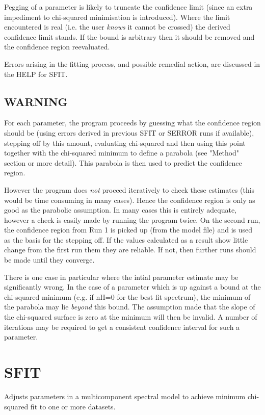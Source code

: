 \documentclass{book}
\renewcommand{\_}{{\tt\char'137}}     %
\begin{document}
Pegging of a parameter is likely to truncate the confidence limit
(since an extra impediment to chi-squared minimisation is
introduced). Where the limit encountered is real (i.e. the user
{\em knows} it cannot be crossed) the derived confidence limit stands.
If the bound is arbitrary then it should be removed and the
confidence region reevaluated.

Errors arising in the fitting process, and possible remedial
action, are discussed in the HELP for SFIT.

\subsection{WARNING}
For each parameter, the program proceeds by guessing what the
confidence region should be (using errors derived in previous
SFIT or SERROR runs if available), stepping off by this amount,
evaluating chi-squared and then using this point together with
the chi-squared minimum to define a parabola (see "Method" section
or more detail). This parabola is then used to predict the
confidence region.

However the program does {\em not} proceed iteratively to check these
estimates (this would be time consuming in many cases). Hence
the confidence region is only as good as the parabolic assumption.
In many cases this is entirely adequate, however a check is easily
made by running the program twice. On the second run, the confidence
region from Run 1 is picked up (from the model file) and is used
as the basis for the stepping off. If the values calculated as a
result show little change from the first run them they are reliable.
If not, then further runs should be made until they converge.

There is one case in particular where the intial parameter estimate
may be significantly wrong. In the case of a parameter which is up
against a bound at the chi-squared minimum (e.g. if nH=0 for the
best fit spectrum), the minimum of the parabola may lie
{\em beyond} this bound. The assumption made that the slope of the
chi-squared surface is zero at the minimum will then be invalid. A
number of iterations may be required to get a consistent confidence
interval for such a parameter.

\section{SFIT}
Adjusts parameters in a multicomponent spectral model to achieve
minimum chi-squared fit to one or more datasets.
\end{document}
